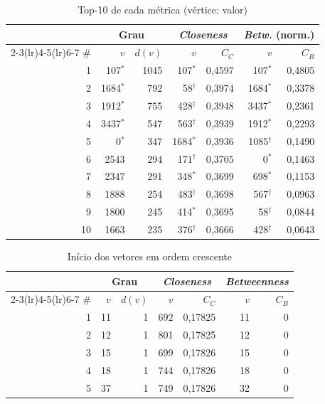 \documentclass[conference]{IEEEtran}
\begin{document}
\begin{table}[htbp]
\caption{Top-10 de cada métrica (vértice: valor)}
\label{tab:top}
\centering
\setlength{\tabcolsep}{3.5pt}
\begin{tabular}{r rr rr rr}
\toprule
& \multicolumn{2}{c}{Grau} & \multicolumn{2}{c}{\textit{Closeness}} & \multicolumn{2}{c}{\textit{Betw.} (norm.)} \\
\cmidrule(lr){2-3}\cmidrule(lr){4-5}\cmidrule(lr){6-7}
\# & $v$ & $d(v)$ & $v$ & $C_C$ & $v$ & $C_B$ \\
\midrule
1 & 107$^*$ & 1045 & 107$^*$ & 0,4597 & 107$^*$ & 0,4805 \\
2 & 1684$^*$ & 792 & 58$^\dagger$ & 0,3974 & 1684$^*$ & 0,3378 \\
3 & 1912$^*$ & 755 & 428$^\dagger$ & 0,3948 & 3437$^*$ & 0,2361 \\
4 & 3437$^*$ & 547 & 563$^\dagger$ & 0,3939 & 1912$^*$ & 0,2293 \\
5 & 0$^*$ & 347 & 1684$^*$ & 0,3936 & 1085$^\dagger$ & 0,1490 \\
6 & 2543 & 294 & 171$^\dagger$ & 0,3705 & 0$^*$ & 0,1463 \\
7 & 2347 & 291 & 348$^*$ & 0,3699 & 698$^*$ & 0,1153 \\
8 & 1888 & 254 & 483$^\dagger$ & 0,3698 & 567$^\dagger$ & 0,0963 \\
9 & 1800 & 245 & 414$^*$ & 0,3695 & 58$^\dagger$ & 0,0844 \\
10 & 1663 & 235 & 376$^\dagger$ & 0,3666 & 428$^\dagger$ & 0,0643 \\
\bottomrule
\end{tabular}
\end{table}

\begin{table}[htbp]
\caption{Início dos vetores em ordem crescente}
\label{tab:bottom}
\centering
\setlength{\tabcolsep}{4pt}
\begin{tabular}{r rr rr rr}
\toprule
& \multicolumn{2}{c}{Grau} & \multicolumn{2}{c}{\textit{Closeness}} & \multicolumn{2}{c}{\textit{Betweenness}} \\
\cmidrule(lr){2-3}\cmidrule(lr){4-5}\cmidrule(lr){6-7}
\# & $v$ & $d(v)$ & $v$ & $C_C$ & $v$ & $C_B$ \\
\midrule
1 & 11 & 1 & 692 & 0,17825 & 11 & 0 \\
2 & 12 & 1 & 801 & 0,17825 & 12 & 0 \\
3 & 15 & 1 & 699 & 0,17826 & 15 & 0 \\
4 & 18 & 1 & 744 & 0,17826 & 18 & 0 \\
5 & 37 & 1 & 749 & 0,17826 & 32 & 0 \\
\bottomrule
\end{tabular}
\end{table}
\end{document}
